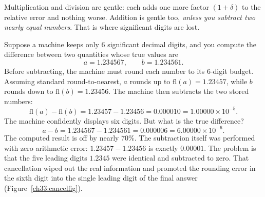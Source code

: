 Multiplication and division are gentle: each adds one more factor $(1+\delta)$ to the
relative error and nothing worse. Addition is gentle too, \emph{unless you subtract two
nearly equal numbers}. That is where significant digits are lost.

\begin{example}
\label{ch33:cancel}
Suppose a machine keeps only $6$ significant decimal digits, and you compute the
difference between two quantities whose true values are
\[
  a = 1.234567, \qquad b = 1.234561.
\]
Before subtracting, the machine must round each number to its $6$-digit budget.
Assuming standard round-to-nearest, $a$ rounds up to $\text{fl}(a) = 1.23457$, while
$b$ rounds down to $\text{fl}(b) = 1.23456$. The machine then subtracts the two stored
numbers:
\[
  \text{fl}(a) - \text{fl}(b) = 1.23457 - 1.23456 = 0.000010 = 1.00000 \times 10^{-5}.
\]
The machine confidently displays six digits. But what is the true difference?
\[
  a - b = 1.234567 - 1.234561 = 0.000006 = 6.00000 \times 10^{-6}.
\]
The computed result is off by nearly $70\%$. The subtraction itself was performed with
zero arithmetic error: $1.23457 - 1.23456$ is exactly $0.00001$. The problem is that the
five leading digits $1.2345$ were identical and subtracted to zero. That cancellation
wiped out the real information and promoted the rounding error in the sixth digit into
the single leading digit of the final answer (Figure~\ref{ch33:cancelfig}).
\end{example}

